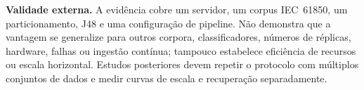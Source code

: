 \textbf{Validade externa.} A evidência cobre um servidor, um corpus IEC~61850, um particionamento, J48 e uma configuração de pipeline. Não demonstra que a vantagem se generalize para outros corpora, classificadores, números de réplicas, hardware, falhas ou ingestão contínua; tampouco estabelece eficiência de recursos ou escala horizontal. Estudos posteriores devem repetir o protocolo com múltiplos conjuntos de dados e medir curvas de escala e recuperação separadamente.

